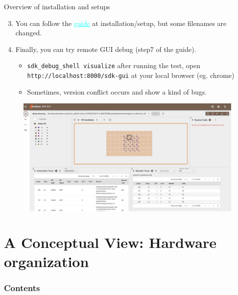 \documentclass[dvipdfmx, 11pt, aspectratio=169]{beamer}   %
\newcommand{\ulhref}[2]{\href{#1}{\textcolor{cyan}{\uline{#2}}}}
\begin{document}
\begin{frame}{Overview of installation and setups}
\begin{enumerate}\setcounter{enumi}{2}
    \item You can follow the \ulhref{https://sdk.cerebras.net/installation-guide}{guide} at installation/setup, but some filenames are changed.
    \item Finally, you can try remote GUI debug (step7 of the guide).
    \begin{itemize}
        \item \lstinline|sdk_debug_shell visualize| after running the test, open \lstinline|http://localhost:8000/sdk-gui| at your local browser (eg. chrome)
        \item Sometimes, version conflict occurs and show a kind of bugs.
    \end{itemize}
\end{enumerate}
\begin{figure}
    \includegraphics[scale=0.12]{img/sdk-gui.png}
\end{figure}
\end{frame}
\section{A Conceptual View: Hardware organization}
\begin{frame}
    \frametitle{Contents}
\end{frame}
\end{document}
